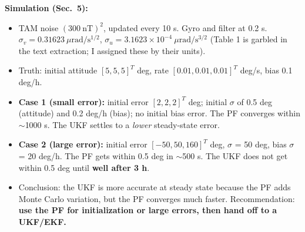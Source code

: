 \documentclass[11pt]{article}
\begin{document}
\textbf{Simulation (Sec.\ 5):}
\begin{itemize}[noitemsep]
    \item TAM noise $(300\ \mathrm{nT})^2$, updated every 10 s. Gyro and filter at 0.2 s. $\sigma_v = 0.31623\ \mu\mathrm{rad/s^{1/2}}$, $\sigma_u = 3.1623\times10^{-4}\ \mu\mathrm{rad/s^{3/2}}$ (Table 1 is garbled in the text extraction; I assigned these by their units).
    \item Truth: initial attitude $[5,5,5]^T$ deg, rate $[0.01,0.01,0.01]^T$ deg/s, bias 0.1 deg/h.
    \item \textbf{Case 1 (small error):} initial error $[2,2,2]^T$ deg; initial $\sigma$ of 0.5 deg (attitude) and 0.2 deg/h (bias); no initial bias error. The PF converges within $\sim$1000 s. The UKF settles to a \textit{lower} steady-state error.
    \item \textbf{Case 2 (large error):} initial error $[-50, 50, 160]^T$ deg, $\sigma$ = 50 deg, bias $\sigma$ = 20 deg/h. The PF gets within 0.5 deg in $\sim$500 s. The UKF does not get within 0.5 deg until \textbf{well after 3 h}.
    \item Conclusion: the UKF is more accurate at steady state because the PF adds Monte Carlo variation, but the PF converges much faster. Recommendation: \textbf{use the PF for initialization or large errors, then hand off to a UKF/EKF.}
\end{itemize}
\end{document}

